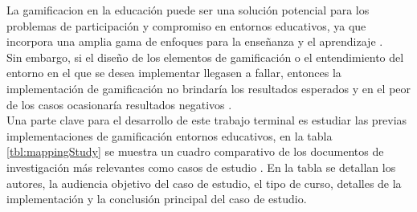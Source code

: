  La \gls{gamificacion} en la educación puede ser una solución potencial para los
 problemas de participación y compromiso en entornos educativos, ya que incorpora una amplia
 gama de enfoques para la enseñanza y el aprendizaje \cite{Aldemir}.\\

 \noindent Sin embargo, si el diseño de los elementos de gamificación o el entendimiento del entorno en el que se
 desea implementar llegasen a fallar, entonces la implementación de gamificación no brindaría
 los resultados esperados y en el peor de los casos ocasionaría resultados negativos
 \cite[p. 1109]{GamInE-Learning}.\\

 \noindent Una parte clave para el desarrollo de este trabajo terminal es estudiar las previas implementaciones
 de gamificación entornos educativos, en la tabla \ref{tbl:mappingStudy} se muestra un cuadro comparativo de los documentos de investigación más relevantes como casos de estudio \cite{mappingStudy}. En la tabla se detallan los autores, la audiencia objetivo del caso de estudio, el tipo de curso, detalles de la implementación y la conclusión principal del caso de estudio.\\

